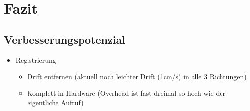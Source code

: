 \documentclass{beamer}
\begin{document}
\section{Fazit}
\begin{frame}{}
\begin{center}
\end{center}
\end{frame}


\subsection{Verbesserungspotenzial}
\begin{frame}{\subsecname}
\begin{itemize}
\item{Registrierung}
\begin{itemize}
\item{Drift entfernen (aktuell noch leichter Drift (1cm/s) in alle 3 Richtungen)}
\item{Komplett in Hardware (Overhead ist fast dreimal so hoch wie der eigentliche Aufruf)}
\end{itemize}
\end{itemize}
\end{frame}
\end{document}
